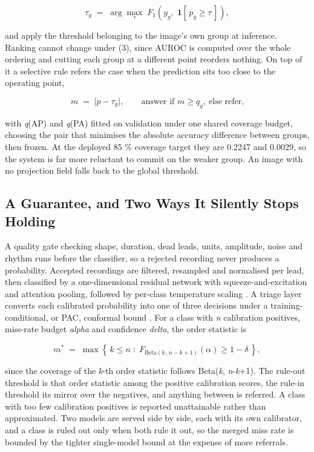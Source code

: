 \documentclass[conference,a4paper]{IEEEtran}
\begin{document}
\begin{equation}
\tau_g \;=\; \arg\max_{\tau}\; F_1\!\left(y_g,\; \mathbf{1}[\,p_g \ge \tau\,]\right),
\end{equation}

and apply the threshold belonging to the image's own group at inference. Ranking cannot change under (3), since AUROC is computed over the whole ordering and cutting each group at a different point reorders nothing. On top of it a selective rule refers the case when the prediction sits too close to the operating point,

\begin{equation}
m \;=\; \lvert p - \tau_g \rvert, \qquad \text{answer if } m \ge q_g, \ \text{else refer,}
\end{equation}

with \textit{q}(AP) and \textit{q}(PA) fitted on validation under one shared coverage budget, choosing the pair that minimises the absolute accuracy difference between groups, then frozen. At the deployed 85 \% coverage target they are 0.2247 and 0.0029, so the system is far more reluctant to commit on the weaker group. An image with no projection field falls back to the global threshold.

\subsection{A Guarantee, and Two Ways It Silently Stops Holding}
A quality gate checking shape, duration, dead leads, units, amplitude, noise and rhythm runs before the classifier, so a rejected recording never produces a probability. Accepted recordings are filtered, resampled and normalised per lead, then classified by a one-dimensional residual network with squeeze-and-excitation and attention pooling, followed by per-class temperature scaling \cite{ref21}. A triage layer converts each calibrated probability into one of three decisions under a training-conditional, or PAC, conformal bound \cite{ref19}. For a class with \textit{n} calibration positives, miss-rate budget \textit{alpha} and confidence \textit{delta}, the order statistic is

\begin{equation}
m^{*} \;=\; \max\left\{\,k \le n \;:\; F_{\mathrm{Beta}(k,\,n-k+1)}(\alpha) \ge 1-\delta \,\right\},
\end{equation}

since the coverage of the \textit{k}-th order statistic follows Beta(\textit{k}, \textit{n}-\textit{k}+1). The rule-out threshold is that order statistic among the positive calibration scores, the rule-in threshold its mirror over the negatives, and anything between is referred. A class with too few calibration positives is reported unattainable rather than approximated. Two models are served side by side, each with its own calibrator, and a class is ruled out only when both rule it out, so the merged miss rate is bounded by the tighter single-model bound at the expense of more referrals.
\end{document}
